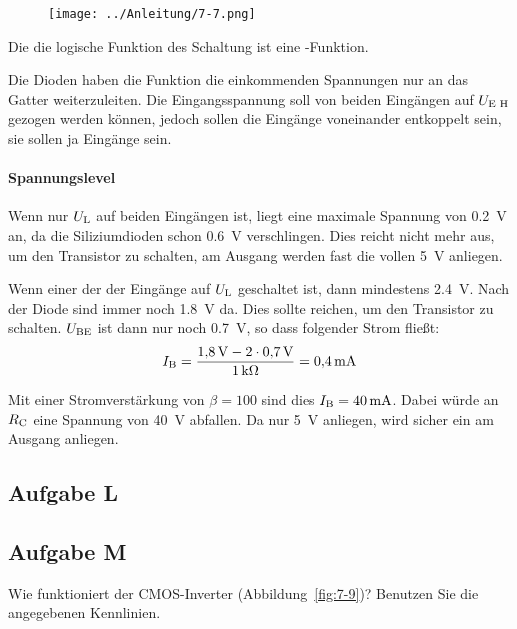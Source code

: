 \begin{figure}[htbp]
	\centering
	\texttt{[image: ../Anleitung/7-7.png]}
	\caption{%
		\cite[Abbildung~7.7]{physik313-Anleitung}
	}
	\label{fig:7-7}
\end{figure}

Die die logische Funktion des Schaltung ist eine \tnor-Funktion.

Die Dioden
haben die Funktion die einkommenden Spannungen nur an das Gatter
weiterzuleiten. Die Eingangsspannung soll von beiden Eingängen auf $\UEH$
gezogen werden können, jedoch sollen die Eingänge voneinander entkoppelt sein,
sie sollen ja Eingänge sein.

\paragraph{Spannungslevel}

Wenn nur $\UL$ auf beiden Eingängen ist, liegt eine maximale Spannung von
\SI{.2}{\volt} an, da die Siliziumdioden schon \SI{.6}{\volt} verschlingen.
Dies reicht nicht mehr aus, um den Transistor zu schalten, am Ausgang werden
fast die vollen \SI{5}{\volt} anliegen.

Wenn einer der der Eingänge auf $\UL$ geschaltet ist, dann mindestens
\SI{2.4}{\volt}. Nach der Diode sind immer noch \SI{1.8}{\volt} da. Dies sollte
reichen, um den Transistor zu schalten. $\UBE$ ist dann nur noch
\SI{.7}{\volt}, so dass folgender Strom fließt:
\[
	\IB = \frac{\SI{1.8}\volt - 2 \cdot \SI{.7}\volt}{\SI1{\kilo\ohm}}
	= \SI{.4}{\milli\ampere}
\]

Mit einer Stromverstärkung von $\beta = 100$ sind dies $\IB =
\SI{40}{\milli\ampere}$. Dabei würde an $\RC$ eine Spannung von \SI{40}{\volt}
abfallen. Da nur \SI{5}{\volt} anliegen, wird sicher ein \thigh{} am Ausgang
anliegen.

\FloatBarrier
\subsection{Aufgabe L}

\fehlt

\FloatBarrier
\subsection{Aufgabe M}

\begin{problem}
	Wie funktioniert der CMOS-Inverter (Abbildung~\ref{fig:7-9})? Benutzen Sie
	die angegebenen Kennlinien.
\end{problem}

